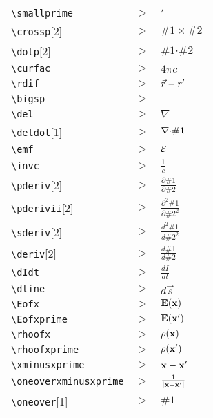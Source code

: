 \begin{tabular}{l l l}

\verb|\smallprime| &$\gt$& ${\scriptscriptstyle{\prime}}$\\[5pt] 
\verb|\crossp|[2] &$\gt$& ${{\#1}\times{\#2}}$\\[5pt] 
\verb|\dotp|[2] &$\gt$& ${{\#1{\boldsymbol{\cdot}}\#2}}$\\[5pt] 
\verb|\curfac| &$\gt$& ${{4\pi{c}}}$\\[5pt] 
\verb|\rdif| &$\gt$& ${\vec{r}-{r^{\prime}}}$\\[5pt] 
\verb|\bigsp| &$\gt$& ${\qquad}$\\[5pt] 
\verb|\del| &$\gt$& ${{\nabla}}$\\[5pt] 
\verb|\deldot|[1] &$\gt$& ${{{\nabla}{\LARGE \cdot}\#1}}$\\[5pt] 
\verb|\emf| &$\gt$& ${{\cal E}}$\\[5pt] 
\verb|\invc| &$\gt$& ${\frac{1}{c}}$\\[5pt] 
\verb|\pderiv|[2] &$\gt$& ${\frac{\partial\#1}{\partial\#2}}$\\[5pt] 
\verb|\pderivii|[2] &$\gt$& ${\frac{\partial^2 \#1}{\partial\#2^2}}$\\[5pt] 
\verb|\sderiv|[2] &$\gt$& ${\frac{d^2\#1}{d\#2^2}}$\\[5pt] 
\verb|\deriv|[2] &$\gt$& ${\frac{d\#1}{d\#2}}$\\[5pt] 
\verb|\dIdt| &$\gt$& ${\frac{dI}{dt}} $\\[5pt] 
\verb|\dline| &$\gt$& ${d\vec{s}}$\\[5pt] 
\verb|\Eofx| &$\gt$& ${{\bf E}({\bf x})}$\\[5pt] 
\verb|\Eofxprime| &$\gt$& ${{\bf E}({\bf x}^{\prime})}$\\[5pt] 
\verb|\rhoofx| &$\gt$& ${\rho({\bf x})}$\\[5pt] 
\verb|\rhoofxprime| &$\gt$& ${\rho({\bf x}^{\prime})}$\\[5pt] 
\verb|\xminusxprime| &$\gt$& ${{\bf x} - {\bf x}^{\prime}}$\\[5pt] 
\verb|\oneoverxminusxprime| &$\gt$& ${\frac{1}{|{\bf x} - {\bf x}^{\prime}|}}$\\[5pt] 
\verb|\oneover|[1] &$\gt$& ${\#1}$\\[5pt] 
\end{tabular}



